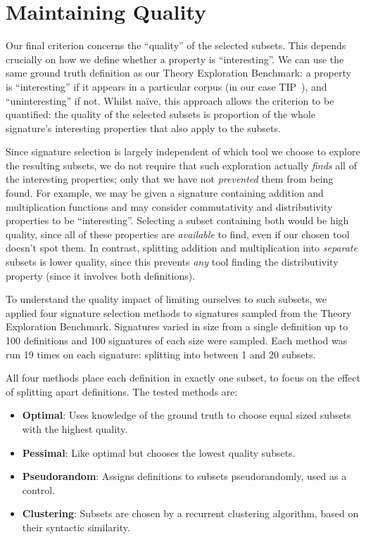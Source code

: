 \section{Maintaining Quality}

Our final criterion concerns the ``quality'' of the selected subsets. This
depends crucially on how we define whether a property is ``interesting''. We can
use the same ground truth definition as our Theory Exploration Benchmark: a
property is ``interesting'' if it appears in a particular corpus (in our case
TIP~\cite{claessen2015tip}), and ``uninteresting'' if not. Whilst na\"ive, this
approach allows the criterion to be quantified: the quality of the selected
subsets is proportion of the whole signature's interesting properties that also
apply to the subsets.

Since signature selection is largely independent of which tool we choose to
explore the resulting subsets, we do not require that such exploration actually
\emph{finds} all of the interesting properties; only that we have not
\emph{prevented} them from being found. For example, we may be given a signature
containing addition and multiplication functions and may consider commutativity
and distributivity properties to be ``interesting''. Selecting a subset
containing both would be high quality, since all of these properties are
\emph{available} to find, even if our chosen tool doesn't spot them. In
contrast, splitting addition and multiplication into \emph{separate} subsets is
lower quality, since this prevents \emph{any} tool finding the distributivity
property (since it involves both definitions).

To understand the quality impact of limiting ourselves to such subsets, we
applied four signature selection methods to signatures sampled from the Theory
Exploration Benchmark. Signatures varied in size from a single definition up to
100 definitions and 100 signatures of each size were sampled. Each method was
run 19 times on each signature: splitting into between 1 and 20 subsets.

All four methods place each definition in exactly one subset, to focus on the
effect of splitting apart definitions. The tested methods are:

\begin{itemize}
\item \textbf{Optimal}: Uses knowledge of the ground truth to choose equal sized
  subsets with the highest quality.
\item \textbf{Pessimal}: Like optimal but chooses the lowest quality subsets.
\item \textbf{Pseudorandom}: Assigns definitions to subsets pseudorandomly, used
  as a control.
\item \textbf{Clustering}: Subsets are chosen by a recurrent clustering
  algorithm, based on their syntactic similarity.
\end{itemize}

